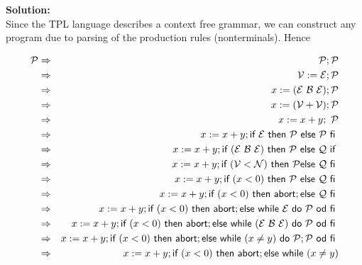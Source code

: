 
\textbf{Solution:}\\
Since the TPL language describes a context free grammar, 
we can construct any program due to parsing of the production rules (nonterminals). Hence

\begin{small}
\begin{eqnarray*}
\mathcal{P} &\Rightarrow &\mathcal{P};\mathcal{P} \\
&\Rightarrow &\mathcal{V}:=\mathcal{E};\mathcal{P} \\
& \Rightarrow &x:=(\mathcal{E}\ \mathcal{B}\ \mathcal{E});\mathcal{P} \\
&\Rightarrow &x:=(\mathcal{V}+\mathcal{V});\mathcal{P} \\
&\Rightarrow &x:=x+y;\ \mathcal{P} \\
&\Rightarrow &x:=x + y; \IF\ \mathcal{E}\ \THEN\ \mathcal{P}\ \ELSE\ \mathcal{P}\ \FI\ \\
&\Rightarrow & x:=x + y; \IF\ (\mathcal{E}\ \mathcal{B}\ \mathcal{E})\ \THEN\ 
 \mathcal{P}\ \ELSE\ \mathcal{Q}\ \IF\ \\
&\Rightarrow & x:=x + y; \IF\ (\mathcal{V}<\mathcal{N})\ \THEN\ \mathcal{P}
  \ELSE\ \mathcal{Q}\ \FI\ \\
% 
&\Rightarrow & x:=x + y; \IF\ (x < 0)\ \THEN\ \mathcal{P}\ \ELSE\ \mathcal{Q%
 }\ \FI\ \\
% 
&\Rightarrow & x:=x + y; \IF\ (x < 0)\ \THEN\ \ABORT; \ELSE\ \mathcal{Q}\ \FI\ \\
% 
&\Rightarrow & x:=x + y; \IF\ (x < 0)\ \THEN\ \ABORT; \ELSE\ \WHILE\ \mathcal{E}
 \ \DO\ \mathcal{P}\ \OD\ \FI\ \\
% 
&\Rightarrow & x:=x + y; \IF\ (x < 0)\ \THEN\ \ABORT; \ELSE\ \WHILE\ (\mathcal{E%
 }\ \mathcal{B}\ \mathcal{E})\ \DO\ \mathcal{P}\ \OD\ \FI\ \\
% 
% 
&\Rightarrow & x:=x + y; \IF\ (x < 0)\ \THEN\ \ABORT; \ELSE\ \WHILE\ (x\neq y)
\ \DO\ \mathcal{P};\mathcal{P}\ \OD\ \FI\ \\
% 
&\Rightarrow & x:=x + y; \IF\ (x < 0)\ \THEN\ \ABORT; \ELSE\ \WHILE\ (x\neq y)

\end{eqnarray*}
\end{small}
